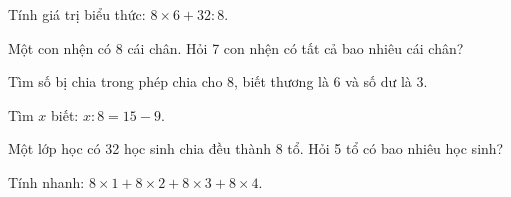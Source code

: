 \begin{ex} %
Tính giá trị biểu thức: $8 \times 6 + 32 : 8$.
\end{ex}

\begin{ex} %
Một con nhện có 8 cái chân. Hỏi 7 con nhện có tất cả bao nhiêu cái chân?
\end{ex}

\begin{ex} %
Tìm số bị chia trong phép chia cho 8, biết thương là 6 và số dư là 3.
\end{ex}

\begin{ex} %
Tìm $x$ biết: $x : 8 = 15 - 9$.
\end{ex}

\begin{ex} %
Một lớp học có 32 học sinh chia đều thành 8 tổ. Hỏi 5 tổ có bao nhiêu học sinh?
\end{ex}

\begin{ex} %
Tính nhanh: $8 \times 1 + 8 \times 2 + 8 \times 3 + 8 \times 4$.
\end{ex}
